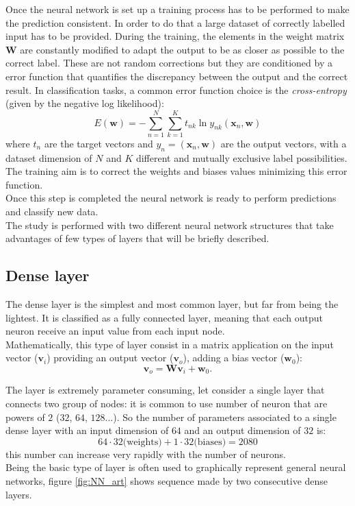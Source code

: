 Once the neural network is set up a training process has to be performed to make the prediction consistent. In order to do that a large dataset of correctly labelled input has to be provided. During the training, the elements in the weight matrix $\bm{W}$ are constantly modified to adapt the output to be as closer as possible to the correct label. These are not random corrections but they are conditioned by a error function that quantifies the discrepancy between the output and the correct result. In classification tasks, a common error function choice is the \textit{cross-entropy} (given by the negative log likelihood):
\begin{equation}\label{eq:err_func}
    E(\bm{w}) = -\sum_{n=1}^N\sum_{k=1}^K t_{nk}\ln{y_{nk}(\bm{x}_n,\bm{w})}
\end{equation}
where $t_n$ are the target vectors and $y_n=(\bm{x}_n,\bm{w})$ are the output vectors, with a dataset dimension of $N$ and $K$ different and mutually exclusive label possibilities.\\
The training aim is to correct the weights and biases values minimizing this error function.\\
Once this step is completed the neural network is ready to perform predictions and classify new data.\\

The study is performed with two different neural network structures that take advantages of few types of layers that will be briefly described.

\subsection*{Dense layer}
The dense layer is the simplest and most common layer, but far from being the lightest. It is classified as a fully connected layer, meaning that each output neuron receive an input value from each input node.\\
Mathematically, this type of layer consist in a matrix application on the input vector ($\bm{v}_i$) providing an output vector ($\bm{v}_o$), adding a bias vector ($\bm{w}_0$):
\begin{equation}
    \bm{v}_o = \bm{W}\bm{v}_i+\bm{w}_0.
\end{equation}

The layer is extremely parameter consuming, let consider a single layer that connects two group of nodes: it is common to use number of neuron that are powers of $2$ ($32$, $64$, $128$...). So the number of parameters associated to a single dense layer with an input dimension of $64$ and an output dimension of $32$ is:
\begin{equation*}
    64 \cdot 32 \text{(weights)} + 1 \cdot 32 \text{(biases)} = 2080
\end{equation*}
this number can increase very rapidly with the number of neurons.\\
Being the basic type of layer is often used to graphically represent general neural networks, figure \ref{fig:NN_art} shows sequence made by two consecutive dense layers.

